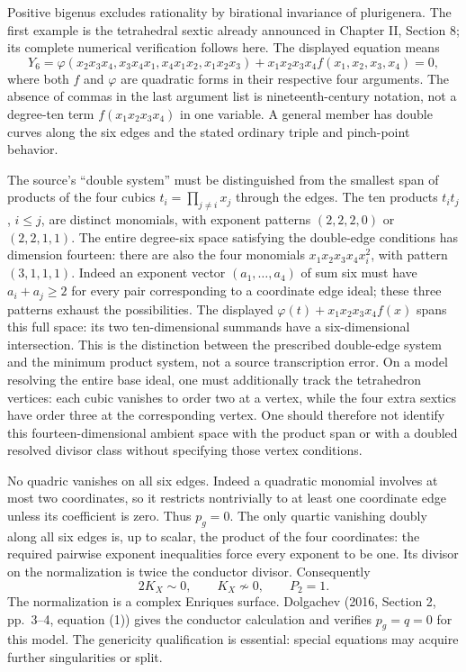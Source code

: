 Positive bigenus excludes rationality by birational invariance of plurigenera. The first example is the tetrahedral sextic already announced in Chapter II, Section 8; its complete numerical verification follows here. The displayed equation means \[
Y_6=\varphi(x_2x_3x_4,x_3x_4x_1,x_4x_1x_2,x_1x_2x_3)
+x_1x_2x_3x_4 f(x_1,x_2,x_3,x_4)=0,
\] where both \(f\) and \(\varphi\) are quadratic forms in their respective four arguments. The absence of commas in the last argument list is nineteenth-century notation, not a degree-ten term \(f(x_1x_2x_3x_4)\) in one variable. A general member has double curves along the six edges and the stated ordinary triple and pinch-point behavior.

The source's ``double system'' must be distinguished from the smallest span of products of the four cubics \(t_i=\prod_{j\ne i}x_j\) through the edges. The ten products \(t_it_j\), \(i\leq j\), are distinct monomials, with exponent patterns \((2,2,2,0)\) or \((2,2,1,1)\). The entire degree-six space satisfying the double-edge conditions has dimension fourteen: there are also the four monomials \(x_1x_2x_3x_4x_i^2\), with pattern \((3,1,1,1)\). Indeed an exponent vector \((a_1,\ldots,a_4)\) of sum six must have \(a_i+a_j\geq2\) for every pair corresponding to a coordinate edge ideal; these three patterns exhaust the possibilities. The displayed \(\varphi(t)+x_1x_2x_3x_4f(x)\) spans this full space: its two ten-dimensional summands have a six-dimensional intersection. This is the distinction between the prescribed double-edge system and the minimum product system, not a source transcription error. On a model resolving the entire base ideal, one must additionally track the tetrahedron vertices: each cubic vanishes to order two at a vertex, while the four extra sextics have order three at the corresponding vertex. One should therefore not identify this fourteen-dimensional ambient space with the product span or with a doubled resolved divisor class without specifying those vertex conditions.

No quadric vanishes on all six edges. Indeed a quadratic monomial involves at most two coordinates, so it restricts nontrivially to at least one coordinate edge unless its coefficient is zero. Thus \(p_g=0\). The only quartic vanishing doubly along all six edges is, up to scalar, the product of the four coordinates: the required pairwise exponent inequalities force every exponent to be one. Its divisor on the normalization is twice the conductor divisor. Consequently \[
2K_X\sim0,\qquad K_X\not\sim0,\qquad P_2=1.
\tag{III.14}
\] The normalization is a complex Enriques surface. Dolgachev (2016, Section 2, pp.~3--4, equation (1)) gives the conductor calculation and verifies \(p_g=q=0\) for this model. The genericity qualification is essential: special equations may acquire further singularities or split.

